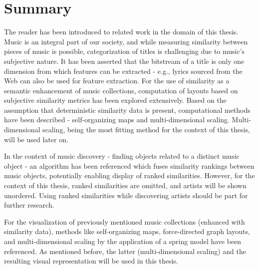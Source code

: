 \section{Summary}

The reader has been introduced to related work in the domain of this thesis. Music is an integral part of our society, and while measuring similarity between pieces of music is possible, categorization of titles is challenging due to music's subjective nature. It has been asserted that the bitstream of a title is only one dimension from which features can be extracted - e.g., lyrics sourced from the Web can also be used for feature extraction. For the use of similarity as a semantic enhancement of music collections, computation of layouts based on subjective similarity metrics has been explored extensively. Based on the assumption that deterministic similarity data is present, computational methods have been described - self-organizing maps and multi-dimensional scaling. Multi-dimensional scaling, being the most fitting method for the context of this thesis, will be used later on.

In the context of music discovery - finding objects related to a distinct music object - an algorithm has been referenced which fuses similarity rankings between music objects, potentially enabling display of ranked similarities. However, for the context of this thesis, ranked similarities are omitted, and artists will be shown unordered. Using ranked similarities while discovering artists should be part for further research.

For the visualization of previously mentioned music collections (enhanced with similarity data), methods like self-organizing maps, force-directed graph layouts, and multi-dimensional scaling by the application of a spring model have been referenced. As mentioned before, the latter (multi-dimensional scaling) and the resulting visual representation will be used in this thesis.